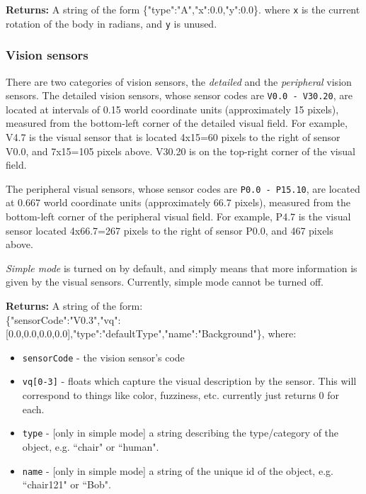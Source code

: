 \noindent \textbf{Returns:} A string of the form \scriptsize{\{"type":"A","x":0.0,"y":0.0\}}. 
\normalsize where \texttt{x} is the current rotation of the body in radians, and \texttt{y} is unused.

\subsubsection{Vision sensors}
\normalsize
There are two categories of vision sensors, the \textit{detailed} and the \textit{peripheral} vision sensors. The detailed vision sensors, whose sensor codes are \texttt{V0.0 - V30.20}, are located at intervals of 0.15 world coordinate units (approximately 15 pixels), measured from the bottom-left corner of the detailed visual field. For example, V4.7 is the visual sensor that is located 4x15=60 pixels to the right of sensor V0.0, and 7x15=105 pixels above. V30.20 is on the top-right corner of the visual field.

The peripheral visual sensors, whose sensor codes are \texttt{P0.0 - P15.10}, are located at 0.667 world coordinate units (approximately 66.7 pixels), measured from the bottom-left corner of the peripheral visual field. For example, P4.7 is the visual sensor located 4x66.7=267 pixels to the right of sensor P0.0, and 467 pixels above.

\textit{Simple mode} is turned on by default, and simply means that more information is given by the visual sensors. Currently, simple mode cannot be turned off.\newline

\noindent \textbf{Returns:} A string of the form:\\ \scriptsize{\{"sensorCode":"V0.3","vq":[0.0,0.0,0.0,0.0],"type":"defaultType","name":"Background"\}}, \normalsize where:

\begin{itemize}
\item \texttt{sensorCode} - the vision sensor's code
\item \texttt{vq[0-3]} - floats which capture the visual description by the sensor. This will correspond to things like color, fuzziness, etc. currently just returns 0 for each.
\item \texttt{type} - [only in simple mode] a string describing the type/category of the object, e.g. ``chair" or ``human".
\item \texttt{name} - [only in simple mode] a string of the unique id of the object, e.g. ``chair121" or ``Bob".
\end{itemize}

